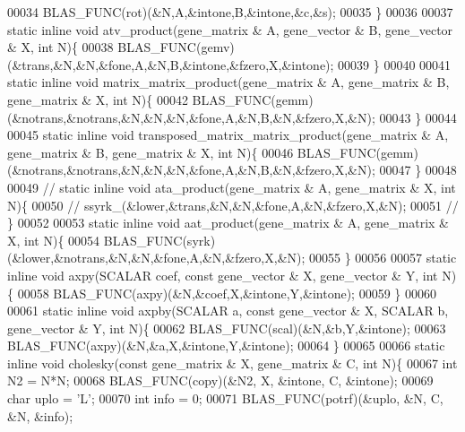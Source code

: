 \begin{DoxyCode}
00034     BLAS\_FUNC(rot)(&N,A,&intone,B,&intone,&c,&s);
00035   \}
00036 
00037   \textcolor{keyword}{static} \textcolor{keyword}{inline} \textcolor{keywordtype}{void} atv\_product(gene\_matrix & A, gene\_vector & B, gene\_vector & X, \textcolor{keywordtype}{int} N)\{
00038     BLAS\_FUNC(gemv)(&trans,&N,&N,&fone,A,&N,B,&intone,&fzero,X,&intone);
00039   \}
00040 
00041   \textcolor{keyword}{static} \textcolor{keyword}{inline} \textcolor{keywordtype}{void} matrix\_matrix\_product(gene\_matrix & A, gene\_matrix & B, gene\_matrix & X, \textcolor{keywordtype}{int} N)\{
00042     BLAS\_FUNC(gemm)(&notrans,&notrans,&N,&N,&N,&fone,A,&N,B,&N,&fzero,X,&N);
00043   \}
00044 
00045   \textcolor{keyword}{static} \textcolor{keyword}{inline} \textcolor{keywordtype}{void} transposed\_matrix\_matrix\_product(gene\_matrix & A, gene\_matrix & B, gene\_matrix & X, \textcolor{keywordtype}{
      int} N)\{
00046     BLAS\_FUNC(gemm)(&notrans,&notrans,&N,&N,&N,&fone,A,&N,B,&N,&fzero,X,&N);
00047   \}
00048 
00049 \textcolor{comment}{//   static inline void ata\_product(gene\_matrix & A, gene\_matrix & X, int N)\{}
00050 \textcolor{comment}{//     ssyrk\_(&lower,&trans,&N,&N,&fone,A,&N,&fzero,X,&N);}
00051 \textcolor{comment}{//   \}}
00052 
00053   \textcolor{keyword}{static} \textcolor{keyword}{inline} \textcolor{keywordtype}{void} aat\_product(gene\_matrix & A, gene\_matrix & X, \textcolor{keywordtype}{int} N)\{
00054     BLAS\_FUNC(syrk)(&lower,&notrans,&N,&N,&fone,A,&N,&fzero,X,&N);
00055   \}
00056 
00057   \textcolor{keyword}{static} \textcolor{keyword}{inline} \textcolor{keywordtype}{void} axpy(SCALAR coef, \textcolor{keyword}{const} gene\_vector & X, gene\_vector & Y, \textcolor{keywordtype}{int} N)\{
00058     BLAS\_FUNC(axpy)(&N,&coef,X,&intone,Y,&intone);
00059   \}
00060 
00061   \textcolor{keyword}{static} \textcolor{keyword}{inline} \textcolor{keywordtype}{void} axpby(SCALAR a, \textcolor{keyword}{const} gene\_vector & X, SCALAR b, gene\_vector & Y, \textcolor{keywordtype}{int} N)\{
00062     BLAS\_FUNC(scal)(&N,&b,Y,&intone);
00063     BLAS\_FUNC(axpy)(&N,&a,X,&intone,Y,&intone);
00064   \}
00065 
00066   \textcolor{keyword}{static} \textcolor{keyword}{inline} \textcolor{keywordtype}{void} cholesky(\textcolor{keyword}{const} gene\_matrix & X, gene\_matrix & C, \textcolor{keywordtype}{int} N)\{
00067     \textcolor{keywordtype}{int} N2 = N*N;
00068     BLAS\_FUNC(copy)(&N2, X, &intone, C, &intone);
00069     \textcolor{keywordtype}{char} uplo = \textcolor{charliteral}{'L'};
00070     \textcolor{keywordtype}{int} info = 0;
00071     BLAS\_FUNC(potrf)(&uplo, &N, C, &N, &info);

\end{DoxyCode}
